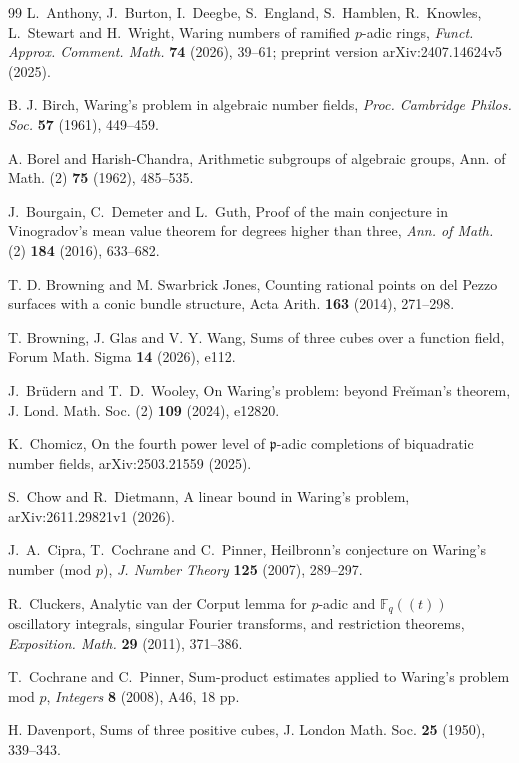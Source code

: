 \documentclass[11pt,letterpaper]{article}
\theoremstyle{definition}
\numberwithin{equation}{section}
\begin{document}
\begin{thebibliography}{99}
L.~Anthony, J.~Burton, I.~Deegbe, S.~England, S.~Hamblen, R.~Knowles,
L.~Stewart and H.~Wright,
Waring numbers of ramified $p$-adic rings,
\emph{Funct. Approx. Comment. Math.} \textbf{74} (2026), 39--61;
preprint version arXiv:2407.14624v5 (2025).

B. J. Birch, Waring's problem in algebraic number fields,
\emph{Proc. Cambridge Philos. Soc.} \textbf{57} (1961), 449--459.

A. Borel and Harish-Chandra, Arithmetic subgroups of algebraic groups, Ann. of Math. (2) \textbf{75} (1962), 485--535.

J.~Bourgain, C.~Demeter and L.~Guth, Proof of the main conjecture in Vinogradov's mean value theorem for degrees higher than three, \emph{Ann. of Math.} (2) \textbf{184} (2016), 633--682.

T. D. Browning and M. Swarbrick Jones, Counting rational points on del Pezzo surfaces with a conic bundle structure, Acta Arith. \textbf{163} (2014), 271--298.

T. Browning, J. Glas and V. Y. Wang, Sums of three cubes over a function field, Forum Math. Sigma \textbf{14} (2026), e112.

J.~Br\"udern and T.~D.~Wooley, On Waring's problem: beyond Fre{\u\i}man's theorem, J. Lond. Math. Soc. (2) \textbf{109} (2024), e12820.

K.~Chomicz,
On the fourth power level of $\mathfrak p$-adic completions of biquadratic number fields,
arXiv:2503.21559 (2025).

S.~Chow and R.~Dietmann, A linear bound in Waring's problem, arXiv:2611.29821v1 (2026).

J.~A.~Cipra, T.~Cochrane and C.~Pinner, Heilbronn's conjecture on
Waring's number (mod $p$), \emph{J. Number Theory}
\textbf{125} (2007), 289--297.

R.~Cluckers, Analytic van der Corput lemma for $p$-adic and $\mathbb F_q((t))$ oscillatory integrals, singular Fourier transforms, and restriction theorems, \emph{Exposition. Math.} \textbf{29} (2011), 371--386.

T.~Cochrane and C.~Pinner, Sum-product estimates applied to Waring's
problem mod $p$, \emph{Integers} \textbf{8} (2008), A46, 18 pp.

H. Davenport, Sums of three positive cubes, J. London Math. Soc. \textbf{25} (1950), 339--343.


\end{thebibliography}
\end{document}
